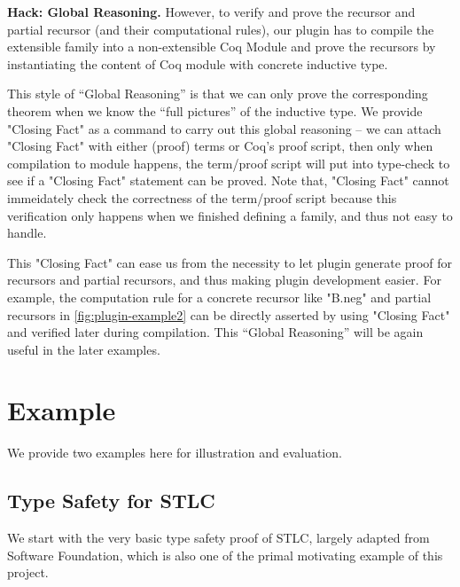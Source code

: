 
\textbf{Hack: Global Reasoning.}
However, to verify and prove the recursor and partial recursor (and their computational rules), our plugin has to compile the extensible family into a non-extensible Coq Module and prove the recursors by instantiating the content of Coq module with concrete inductive type.  

This style of ``Global Reasoning'' is that we can only prove the corresponding theorem when we know the ``full pictures'' of the inductive type. We provide "Closing Fact" as a command to carry out this global reasoning -- we can attach "Closing Fact" with either (proof) terms or Coq's proof script, then only when compilation to module happens, the term/proof script will put into type-check to see if a "Closing Fact" statement can be proved. Note that, "Closing Fact" cannot immeidately check the correctness of the term/proof script because this verification only happens when we finished defining a family, and thus not easy to handle.

This "Closing Fact" can ease us from the necessity to let plugin generate proof for recursors and partial recursors, and thus making plugin development easier. For example, the computation rule for a concrete recursor like "B.neg" and partial recursors in \cref*{fig:plugin-example2} can be directly asserted by using "Closing Fact" and verified later during compilation. This ``Global Reasoning'' will be again useful in the later examples.

\section{Example}
We provide two examples here for illustration and evaluation. 

\subsection{Type Safety for STLC}
We start with the very basic type safety proof of STLC, largely adapted from Software Foundation, which is also one of the primal motivating example of this project. 

